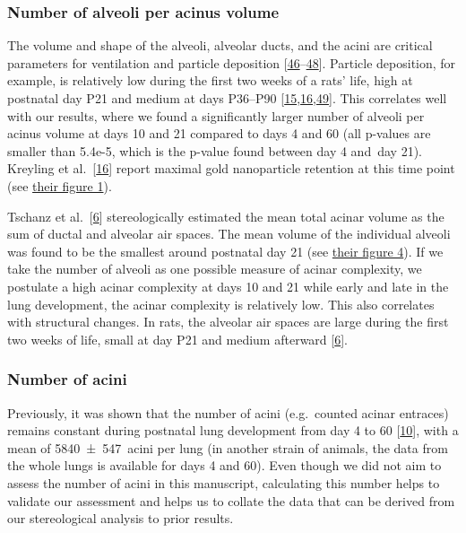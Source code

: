 \documentclass[
  american,
]{article}
\begin{document}
\hypertarget{number-of-alveoli-per-acinus-volume}{%
\subsubsection{Number of alveoli per acinus volume}\label{number-of-alveoli-per-acinus-volume}}

The volume and shape of the alveoli, alveolar ducts, and the acini are critical parameters for ventilation and particle deposition {[}\protect\hyperlink{ref-eioib1TQ}{46}--\protect\hyperlink{ref-OT4s1CSX}{48}{]}.
Particle deposition, for example, is relatively low during the first two weeks of a rats' life, high at postnatal day P21 and medium at days P36--P90 {[}\protect\hyperlink{ref-yHHhvOtP}{15},\protect\hyperlink{ref-18DcNLAv6}{16},\protect\hyperlink{ref-VJYqPtdT}{49}{]}.
This correlates well with our results, where we found a significantly larger number of alveoli per acinus volume at days 10 and 21 compared to days 4 and 60 (all p-values are smaller than 5.4e-5, which is the p-value found between day 4 and~day 21).
Kreyling et al.~{[}\protect\hyperlink{ref-18DcNLAv6}{16}{]} report maximal gold nanoparticle retention at this time point (see \href{https://pubs.acs.org/doi/10.1021/acsnano.8b01826\#fig1}{their figure 1}).

Tschanz et al.~{[}\protect\hyperlink{ref-wnl86DEM}{6}{]} stereologically estimated the mean total acinar volume as the sum of ductal and alveolar air spaces.
The mean volume of the individual alveoli was found to be the smallest around postnatal day 21 (see \href{https://www.physiology.org/na101/home/literatum/publisher/physio/journals/content/jappl/2014/jappl.2014.117.issue-1/japplphysiol.01355.2013/production/images/medium/zdg0121410620004.jpeg}{their figure 4}).
If we take the number of alveoli as one possible measure of acinar complexity, we postulate a high acinar complexity at days 10 and 21 while early and late in the lung development, the acinar complexity is relatively low.
This also correlates with structural changes.
In rats, the alveolar air spaces are large during the first two weeks of life, small at day P21 and medium afterward {[}\protect\hyperlink{ref-wnl86DEM}{6}{]}.

\hypertarget{number-of-acini-1}{%
\subsubsection{Number of acini}\label{number-of-acini-1}}

Previously, it was shown that the number of acini (e.g.~counted acinar entraces) remains constant during postnatal lung development from day 4 to 60 {[}\protect\hyperlink{ref-14OP85b2F}{10}{]}, with a mean of 5840~±~547~acini per lung (in another strain of animals, the data from the whole lungs is available for days 4 and 60).
Even though we did not aim to assess the number of acini in this manuscript, calculating this number helps to validate our assessment and helps us to collate the data that can be derived from our stereological analysis to prior results.
\end{document}
